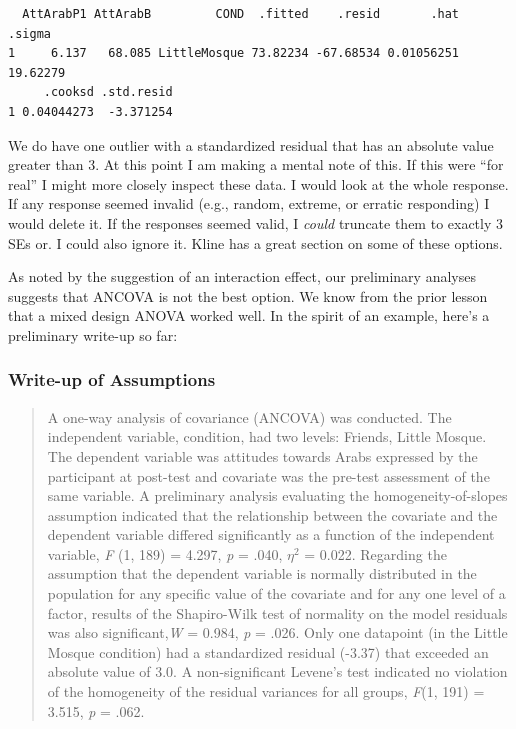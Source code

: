\documentclass[
  11pt,
]{book}
\begin{document}
\begin{verbatim}
  AttArabP1 AttArabB         COND  .fitted    .resid       .hat   .sigma
1     6.137   68.085 LittleMosque 73.82234 -67.68534 0.01056251 19.62279
     .cooksd .std.resid
1 0.04044273  -3.371254
\end{verbatim}

We do have one outlier with a standardized residual that has an absolute value greater than 3. At this point I am making a mental note of this. If this were ``for real'' I might more closely inspect these data. I would look at the whole response. If any response seemed invalid (e.g., random, extreme, or erratic responding) I would delete it. If the responses seemed valid, I \emph{could} truncate them to exactly 3 SEs or. I could also ignore it. Kline \citeyearpar{kline_principles_2016} has a great section on some of these options.

As noted by the suggestion of an interaction effect, our preliminary analyses suggests that ANCOVA is not the best option. We know from the prior lesson that a mixed design ANOVA worked well. In the spirit of an example, here's a preliminary write-up so far:

\hypertarget{write-up-of-assumptions}{%
\subsubsection{Write-up of Assumptions}\label{write-up-of-assumptions}}

\begin{quote}
A one-way analysis of covariance (ANCOVA) was conducted. The independent variable, condition, had two levels: Friends, Little Mosque. The dependent variable was attitudes towards Arabs expressed by the participant at post-test and covariate was the pre-test assessment of the same variable. A preliminary analysis evaluating the homogeneity-of-slopes assumption indicated that the relationship between the covariate and the dependent variable differed significantly as a function of the independent variable, \emph{F} (1, 189) = 4.297, \emph{p} = .040, \(\eta^2\) = 0.022. Regarding the assumption that the dependent variable is normally distributed in the population for any specific value of the covariate and for any one level of a factor, results of the Shapiro-Wilk test of normality on the model residuals was also significant,\emph{W} = 0.984, \emph{p} = .026. Only one datapoint (in the Little Mosque condition) had a standardized residual (-3.37) that exceeded an absolute value of 3.0. A non-significant Levene's test indicated no violation of the homogeneity of the residual variances for all groups, \emph{F}(1, 191) = 3.515, \emph{p} = .062.
\end{quote}
\end{document}
